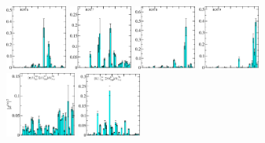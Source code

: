 \begin{figure}[H]
    \hspace*{0.075cm}\includegraphics[width=0.18\textwidth]{figures/sigmas/hg/zfactors/zfactor_isotriplet-S-1-P000-Hg_1-ROT-6.pdf}
    \hspace*{-0.1cm}\includegraphics[width=0.185\textwidth]{figures/sigmas/hg/zfactors/zfactor_isotriplet-S-1-P000-Hg_1-ROT-7.pdf}
    \hspace*{0.1cm}\includegraphics[width=0.18\textwidth]{figures/sigmas/hg/zfactors/zfactor_isotriplet-S-1-P000-Hg_1-ROT-8.pdf}
    \includegraphics[width=0.18\textwidth]{figures/sigmas/hg/zfactors/zfactor_isotriplet-S-1-P000-Hg_1-ROT-9.pdf}\\
    \hspace*{-0.1cm}\includegraphics[width=0.205\textwidth]{figures/sigmas/hg/zfactors/zfactor_isotriplet_eta_sigma-Hg_1-P010-A2p-SS_1-P0-10-G1-SS_0.pdf}
    \includegraphics[width=0.185\textwidth]{figures/sigmas/hg/zfactors/zfactor_isotriplet_kaon_xi-Hg_1-P010-A2-SS_1-P0-10-G1-SS_0.pdf}

\end{figure}

